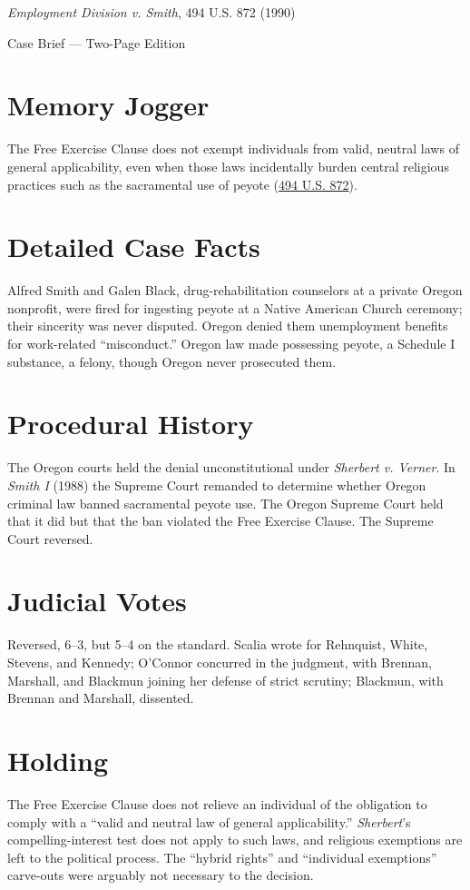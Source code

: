 \documentclass[12pt]{article}
\begin{document}
\begin{center}
{\LARGE \textit{Employment Division v. Smith}, 494 U.S. 872 (1990)\par}
\vspace{0.5em}
{\large Case Brief --- Two-Page Edition\par}
\end{center}

\section{Memory Jogger}
The Free Exercise Clause does not exempt individuals from valid, neutral laws of general applicability, even when those laws incidentally burden central religious practices such as the sacramental use of peyote (\href{https://supreme.justia.com/cases/federal/us/494/872/}{494 U.S. 872}).

\section{Detailed Case Facts}
Alfred Smith and Galen Black, drug-rehabilitation counselors at a private Oregon nonprofit, were fired for ingesting peyote at a Native American Church ceremony; their sincerity was never disputed. Oregon denied them unemployment benefits for work-related ``misconduct.'' Oregon law made possessing peyote, a Schedule I substance, a felony, though Oregon never prosecuted them.

\section{Procedural History}
The Oregon courts held the denial unconstitutional under \textit{Sherbert v. Verner}. In \textit{Smith I} (1988) the Supreme Court remanded to determine whether Oregon criminal law banned sacramental peyote use. The Oregon Supreme Court held that it did but that the ban violated the Free Exercise Clause. The Supreme Court reversed.

\section{Judicial Votes}
Reversed, 6--3, but 5--4 on the standard. Scalia wrote for Rehnquist, White, Stevens, and Kennedy; O'Connor concurred in the judgment, with Brennan, Marshall, and Blackmun joining her defense of strict scrutiny; Blackmun, with Brennan and Marshall, dissented.

\section{Holding}
The Free Exercise Clause does not relieve an individual of the obligation to comply with a ``valid and neutral law of general applicability.'' \textit{Sherbert}'s compelling-interest test does not apply to such laws, and religious exemptions are left to the political process. The ``hybrid rights'' and ``individual exemptions'' carve-outs were arguably not necessary to the decision.
\end{document}
